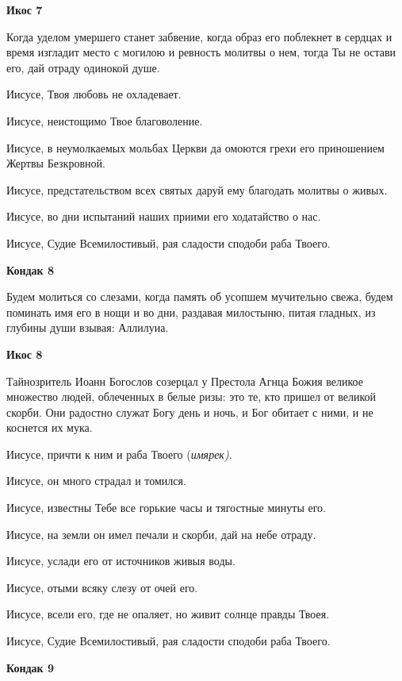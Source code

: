 \medskip


\bfseries Икос 7\normalfont{}


Когда уделом умершего станет забвение, когда образ его поблекнет в сердцах и время изгладит место с могилою и ревность молитвы о нем, тогда Ты не остави его, дай отраду одинокой душе. 

Иисусе, Твоя любовь не охладевает. 

Иисусе, неистощимо Твое благоволение. 

Иисусе, в неумолкаемых мольбах Церкви да омоются грехи его приношением Жертвы Безкровной. 

Иисусе, предстательством всех святых даруй ему благодать молитвы о живых. 

Иисусе, во дни испытаний наших приими его ходатайство о нас. 

Иисусе, Судие Всемилостивый, рая сладости сподоби раба Твоего.


\medskip


\bfseries Кондак 8\normalfont{}


Будем молиться со слезами, когда память об усопшем мучительно свежа, будем поминать имя его в нощи и во дни, раздавая милостыню, питая гладных, из глубины души взывая: Аллилуиа.


\medskip


\bfseries Икос 8\normalfont{}


Тайнозритель Иоанн Богослов созерцал у Престола Агнца Божия великое множество людей, облеченных в белые ризы: это те, кто пришел от великой скорби. Они радостно служат Богу день и ночь, и Бог обитает с ними, и не коснется их мука. 

Иисусе, причти к ним и раба Твоего (\itshape имярек\normalfont{}). 

Иисусе, он много страдал и томился. 

Иисусе, известны Тебе все горькие часы и тягостные минуты его. 

Иисусе, на земли он имел печали и скорби, дай на небе отраду. 

Иисусе, услади его от источников живыя воды. 

Иисусе, отыми всяку слезу от очей его. 

Иисусе, всели его, где не опаляет, но живит солнце правды Твоея. 

Иисусе, Судие Всемилостивый, рая сладости сподоби раба Твоего.


\medskip


\bfseries Кондак 9\normalfont{}


